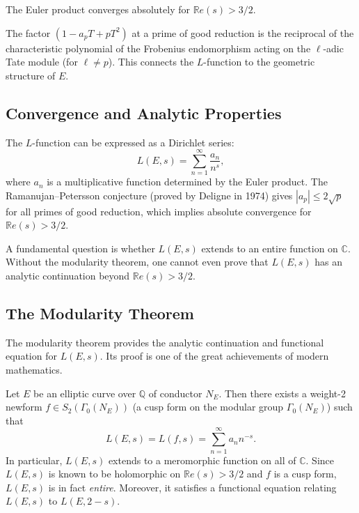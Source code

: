 The Euler product converges absolutely for $\mathbb{R}e(s) > 3/2$.

\begin{remark}
The factor $(1 - a_p T + pT^2)$ at a prime of good reduction is the reciprocal of the characteristic polynomial of the Frobenius endomorphism acting on the $\ell$-adic Tate module (for $\ell \neq p$). This connects the $L$-function to the geometric structure of $E$.
\end{remark}

\subsection{Convergence and Analytic Properties}

The $L$-function can be expressed as a Dirichlet series:
\[
L(E, s) = \sum_{n=1}^{\infty} \frac{a_n}{n^s},
\]
where $a_n$ is a multiplicative function determined by the Euler product. The Ramanujan--Petersson conjecture (proved by Deligne in 1974) gives $|a_p| \le 2\sqrt{p}$ for all primes of good reduction, which implies absolute convergence for $\mathbb{R}e(s) > 3/2$.

A fundamental question is whether $L(E, s)$ extends to an entire function on $\mathbb{C}$. Without the modularity theorem, one cannot even prove that $L(E, s)$ has an analytic continuation beyond $\mathbb{R}e(s) > 3/2$.

\subsection{The Modularity Theorem}

The modularity theorem provides the analytic continuation and functional equation for $L(E, s)$. Its proof is one of the great achievements of modern mathematics.

\begin{theorem}
\label{thm:modularity}
Let $E$ be an elliptic curve over $\mathbb{Q}$ of conductor $N_E$. Then there exists a weight-2 newform $f \in S_2(\Gamma_0(N_E))$ (a cusp form on the modular group $\Gamma_0(N_E)$) such that
\[
L(E, s) = L(f, s) = \sum_{n=1}^{\infty} a_n n^{-s}.
\]
In particular, $L(E, s)$ extends to a meromorphic function on all of $\mathbb{C}$. Since $L(E, s)$ is known to be holomorphic on $\mathbb{R}e(s) > 3/2$ and $f$ is a cusp form, $L(E, s)$ is in fact \emph{entire}. Moreover, it satisfies a functional equation relating $L(E, s)$ to $L(E, 2 - s)$.
\end{theorem}

